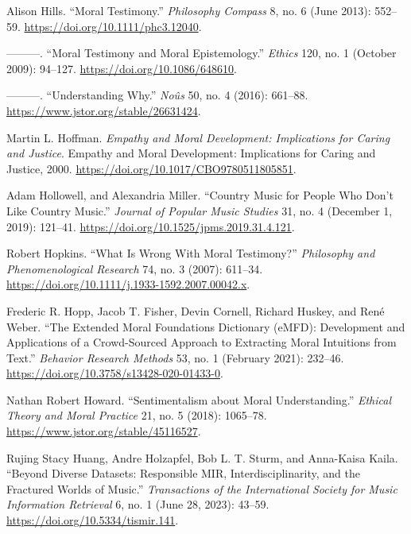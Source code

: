 \documentclass[phdthesis,12pt,final,a4paper]{wuthesis}
\newlength{\cslhangindent}
\newenvironment{CSLReferences}[2] %
{\begin{list}{}{%
	\setlength{\itemindent}{0pt}
	\setlength{\leftmargin}{0pt}
	\setlength{\parsep}{0pt}
	\ifodd #1
	\setlength{\leftmargin}{\cslhangindent}
	\setlength{\itemindent}{-1\cslhangindent}
	\fi
	\setlength{\itemsep}{#2\baselineskip}}}
{\end{list}}
\theoremstyle{definition}
\theoremstyle{definition}
\theoremstyle{definition}
\theoremstyle{definition}
\theoremstyle{remark}
\begin{document}
\begin{CSLReferences}{1}{0}
Alison Hills. {``Moral {Testimony}.''} \emph{Philosophy Compass} 8, no. 6 (June 2013): 552--59. \url{https://doi.org/10.1111/phc3.12040}.

---------. {``Moral Testimony and Moral Epistemology.''} \emph{Ethics} 120, no. 1 (October 2009): 94--127. \url{https://doi.org/10.1086/648610}.

---------. {``Understanding {Why}.''} \emph{Noûs} 50, no. 4 (2016): 661--88. \url{https://www.jstor.org/stable/26631424}.

Martin L. Hoffman. \emph{Empathy and Moral Development: {Implications} for Caring and Justice}. Empathy and Moral Development: {Implications} for Caring and Justice, 2000. \url{https://doi.org/10.1017/CBO9780511805851}.

Adam Hollowell, and Alexandria Miller. {``Country {Music} for {People Who Don}'t {Like Country Music}.''} \emph{Journal of Popular Music Studies} 31, no. 4 (December 1, 2019): 121--41. \url{https://doi.org/10.1525/jpms.2019.31.4.121}.

Robert Hopkins. {``What {Is Wrong With Moral Testimony}?''} \emph{Philosophy and Phenomenological Research} 74, no. 3 (2007): 611--34. \url{https://doi.org/10.1111/j.1933-1592.2007.00042.x}.

Frederic R. Hopp, Jacob T. Fisher, Devin Cornell, Richard Huskey, and René Weber. {``The Extended {Moral Foundations Dictionary} ({eMFD}): {Development} and Applications of a Crowd-Sourced Approach to Extracting Moral Intuitions from Text.''} \emph{Behavior Research Methods} 53, no. 1 (February 2021): 232--46. \url{https://doi.org/10.3758/s13428-020-01433-0}.

Nathan Robert Howard. {``Sentimentalism about {Moral Understanding}.''} \emph{Ethical Theory and Moral Practice} 21, no. 5 (2018): 1065--78. \url{https://www.jstor.org/stable/45116527}.

Rujing Stacy Huang, Andre Holzapfel, Bob L. T. Sturm, and Anna-Kaisa Kaila. {``Beyond {Diverse Datasets}: {Responsible MIR}, {Interdisciplinarity}, and the {Fractured Worlds} of {Music}.''} \emph{Transactions of the International Society for Music Information Retrieval} 6, no. 1 (June 28, 2023): 43--59. \url{https://doi.org/10.5334/tismir.141}.


\end{CSLReferences}
\end{document}

